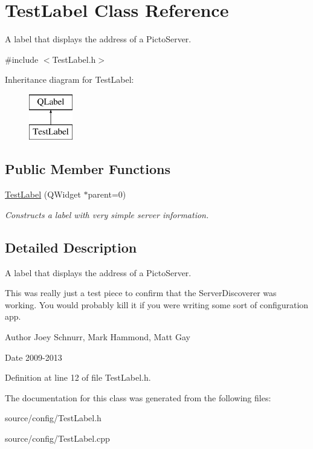\hypertarget{class_test_label}{\section{Test\-Label Class Reference}
\label{class_test_label}
}


A label that displays the address of a Picto\-Server.  




{\ttfamily \#include $<$Test\-Label.\-h$>$}

Inheritance diagram for Test\-Label\-:\begin{figure}[H]
\begin{center}
\leavevmode
\includegraphics[height=2.000000cm]{class_test_label}
\end{center}
\end{figure}
\subsection*{Public Member Functions}
\begin{DoxyCompactItemize}
\item 
\hypertarget{class_test_label_afc0fe4bc4b26af9e5f2b61cb1f05223a}{\hyperlink{class_test_label_afc0fe4bc4b26af9e5f2b61cb1f05223a}{Test\-Label} (Q\-Widget $\ast$parent=0)}\label{class_test_label_afc0fe4bc4b26af9e5f2b61cb1f05223a}

\begin{DoxyCompactList}\small\item\em Constructs a label with very simple server information. \end{DoxyCompactList}\end{DoxyCompactItemize}


\subsection{Detailed Description}
A label that displays the address of a Picto\-Server. 

This was really just a test piece to confirm that the Server\-Discoverer was working. You would probably kill it if you were writing some sort of configuration app. \begin{DoxyAuthor}{Author}
Joey Schnurr, Mark Hammond, Matt Gay 
\end{DoxyAuthor}
\begin{DoxyDate}{Date}
2009-\/2013 
\end{DoxyDate}


Definition at line 12 of file Test\-Label.\-h.



The documentation for this class was generated from the following files\-:\begin{DoxyCompactItemize}
\item 
source/config/Test\-Label.\-h\item 
source/config/Test\-Label.\-cpp\end{DoxyCompactItemize}

